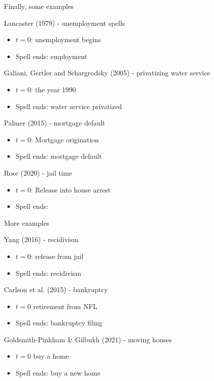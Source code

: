 \documentclass[notes,11pt, aspectratio=169]{beamer}
\newenvironment{wideitemize}{\itemize\addtolength{\itemsep}{10pt}}{\enditemize}
\begin{document}
\begin{frame}{Finally, some examples}
  \begin{wideitemize}
  \item Lancaster (1979) - unemployment spells
    \begin{itemize}
    \item $t=0$: unemployment begins
    \item Spell ends: employment
    \end{itemize}
  \item Galiani, Gertler and Schargrodsky (2005) - privatizing water service 
    \begin{itemize}
    \item $t=0$: the year 1990
    \item Spell ends: water service privatized      
    \end{itemize}
  \item Palmer (2015) - mortgage default
    \begin{itemize}
    \item $t = 0$: Mortgage origination
    \item Spell ends: mortgage default
    \end{itemize}
  \item Rose (2020) - jail time
    \begin{itemize}
    \item $t = 0$: Release into house arrest
    \item Spell ends:  
    \end{itemize}
  \end{wideitemize}
\end{frame}


\begin{frame}{More examples}
  \begin{wideitemize}
  \item Yang (2016) - recidivism
    \begin{itemize}
    \item $t=0$: release from jail
    \item Spell ends: recidivism
    \end{itemize}
  \item Carlson et al. (2015) - bankruptcy
    \begin{itemize}
    \item $t = 0$ retirement from NFL
    \item Spell ends: bankruptcy filing
    \end{itemize}
  \item Goldsmith-Pinkham \& Gilbukh (2021) - moving houses
    \begin{itemize}
    \item $t = 0$ buy a home
    \item Spell ends: buy a new home
    \end{itemize}
  \end{wideitemize}
\end{frame}
\end{document}
